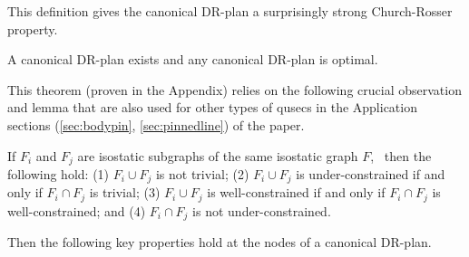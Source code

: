 This definition gives the canonical DR-plan a surprisingly strong Church-Rosser property.

\begin{theorem}
\label{theorem:canonical_exists_and_is_optimal}
\label{theorem:canonical_is_optimal}
\label{theorem:main}
    A canonical DR-plan exists and any canonical DR-plan is optimal.
\end{theorem}






This theorem (proven in the Appendix) relies on the following crucial observation and lemma
that are also used for other types of qusecs in the Application sections (\ref{sec:bodypin}, \ref{sec:pinnedline}) of
the paper.

\begin{observation}\label{lemma:union_intersection}
If $F_i$ and $F_j$ are isostatic subgraphs of the same
isostatic graph $F$, \
then the following hold:
(1) $F_i\cup F_j$ is not trivial;
(2) $F_i\cup F_j$ is under-constrained if and only if $F_i\cap F_j$ is trivial;
(3) $F_i\cup F_j$ is well-constrained if and only if $F_i\cap F_j$ is well-constrained; and
(4) $F_i\cap F_j$ is not under-constrained.
\end{observation}

Then the following key properties hold at the nodes of a canonical DR-plan.

